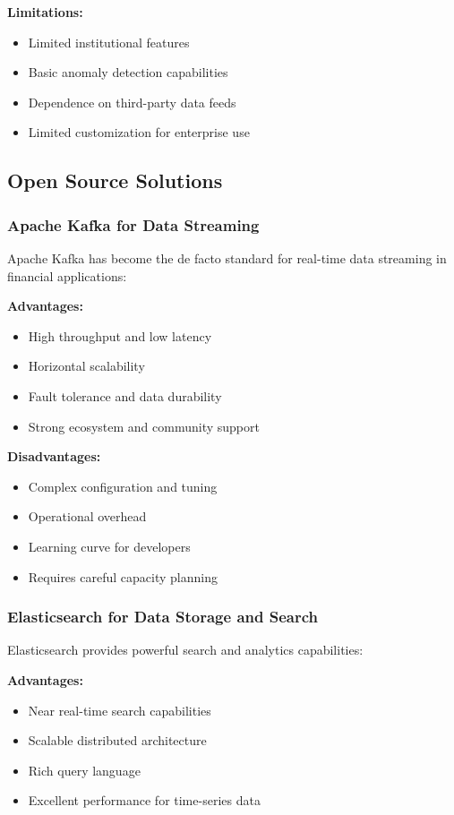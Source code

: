 \textbf{Limitations:}
\begin{itemize}
    \item Limited institutional features
    \item Basic anomaly detection capabilities
    \item Dependence on third-party data feeds
    \item Limited customization for enterprise use
\end{itemize}

\subsection{Open Source Solutions}

\subsubsection{Apache Kafka for Data Streaming}

Apache Kafka has become the de facto standard for real-time data streaming in financial applications:

\textbf{Advantages:}
\begin{itemize}
    \item High throughput and low latency
    \item Horizontal scalability
    \item Fault tolerance and data durability
    \item Strong ecosystem and community support
\end{itemize}

\textbf{Disadvantages:}
\begin{itemize}
    \item Complex configuration and tuning
    \item Operational overhead
    \item Learning curve for developers
    \item Requires careful capacity planning
\end{itemize}

\subsubsection{Elasticsearch for Data Storage and Search}

Elasticsearch provides powerful search and analytics capabilities:

\textbf{Advantages:}
\begin{itemize}
    \item Near real-time search capabilities
    \item Scalable distributed architecture
    \item Rich query language
    \item Excellent performance for time-series data
\end{itemize}

